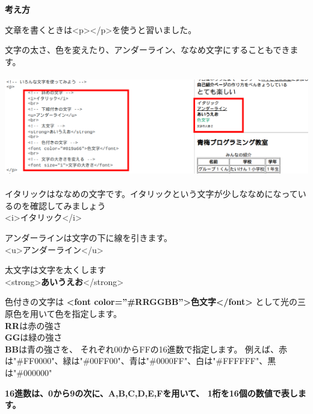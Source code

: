 \documentclass[a4paper,12pt]{jarticle}
\begin{document}
\bigskip

\flushleft
\textbf{考え方}



文章を書くときは{\textless}p{\textgreater}{\textless}/p{\textgreater}を使うと習いました。

文字の太さ、色を変えたり、アンダーライン、ななめ文字にすることもできます。

\centering
\includegraphics[width=14.284cm,height=4.427cm]{textbook-img186.png}

\bigskip

\flushleft

イタリックはななめの文字です。イタリックという文字が少しななめになっているのを確認してみましょう\\
{\textless}i{\textgreater}イタリック{\textless}/i{\textgreater}\\

\bigskip

アンダーラインは文字の下に線を引きます。\\
{\textless}u{\textgreater}アンダーライン{\textless}/u{\textgreater}\\

\bigskip

太文字は文字を太くします\\
{\textless}strong{\textgreater}\textbf{あいうえお}{\textless}/strong{\textgreater}


\bigskip
色付きの文字は
\textbf{{\textless}font color=”\#RRGGBB”{\textgreater}色文字{\textless}/font{\textgreater}}
として光の三原色を用いて色を指定します。\\
\textbf{RR}は赤の強さ\\
\textbf{GG}は緑の強さ\\
\textbf{BB}は青の強さを、
それぞれ00からFFの16進数で指定します。
例えば、赤は"\#FF0000"、緑は"\#00FF00"、青は"\#0000FF"、白は"\#FFFFFF"、黒は"\#000000"

\bigskip
\textbf{16進数は、0から9の次に、A,B,C,D,E,Fを用いて、
1桁を16個の数値で表します。}

\bigskip
\end{document}
